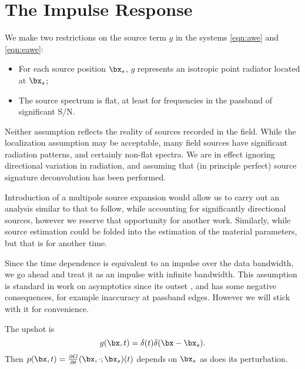 \section{The Impulse Response}
We make two restrictions on the source term $g$ in the systems
\ref{eqn:awe} and \ref{eqn:eawe}:
\begin{itemize}
\item For each source position $\bx_s$, $g$ represents an isotropic
  point radiator located at $\bx_s$;
\item The source spectrum is flat, at least for frequencies in the
  passband of significant S/N.
\end{itemize}
Neither assumption reflects the reality of sources recorded in the
field. While the localization assumption may be acceptable, many field
sources have significant radiation patterns, and certainly non-flat
spectra. We are in effect ignoring directional variation in radiation,
and assuming that (in principle perfect) source signature
deconvolution has been performed.

Introduction of a multipole source
expansion would allow us to carry out an analysis similar to that to
follow, while accounting for significantly directional
sources, however we reserve that opportunity for another
work. Similarly, while source estimation could be folded into the
estimation of the material parameters, but that is for another time.

Since the time dependence is equivalent to an impulse over the data
bandwidth, we go ahead and treat it as an impulse with infinite
bandwidth. This assumption is standard in work on asymptotics since
its outset \cite[]{CohBlei:77}, and has some negative consequences, for example
inaccuracy at passband edges. However we will stick with it for
convenience.

The upshot is 
\begin{equation}
\label{eqn:isopt}
g(\bx,t) = \delta(t)\delta(\bx-\bx_s).
\end{equation}
Then $p(\bx,t) = \frac{\partial G}{\partial t}(\bx,\cdot;\bx_s)(t)$ depends on $\bx_s$ as
does its perturbation. 


